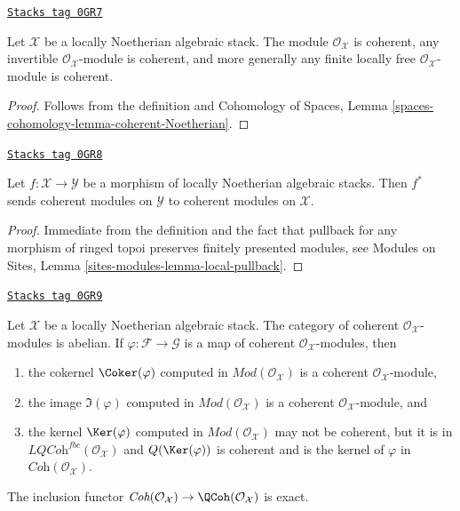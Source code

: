\begin{lemma}
\label{stacks-cohomology-lemma-elementary-coherent}
\href{https://stacks.math.columbia.edu/tag/0GR7}{\texttt{Stacks tag 0GR7}}

Let $\mathcal{X}$ be a locally Noetherian algebraic stack.
The module $\mathcal{O}_\mathcal{X}$ is coherent, any invertible
$\mathcal{O}_\mathcal{X}$-module is coherent, and more generally any
finite locally free $\mathcal{O}_\mathcal{X}$-module is coherent.
\end{lemma}

\begin{proof}
Follows from the definition and
Cohomology of Spaces, Lemma
\ref{spaces-cohomology-lemma-coherent-Noetherian}.
\end{proof}

\begin{lemma}
\label{stacks-cohomology-lemma-pullback-coherent}
\href{https://stacks.math.columbia.edu/tag/0GR8}{\texttt{Stacks tag 0GR8}}

Let $f : \mathcal{X} \to \mathcal{Y}$ be a morphism of locally
Noetherian algebraic stacks. Then $f^*$ sends coherent modules
on $\mathcal{Y}$ to coherent modules on $\mathcal{X}$.
\end{lemma}

\begin{proof}
Immediate from the definition and the fact that pullback for any morphism
of ringed topoi preserves finitely presented modules, see
Modules on Sites, Lemma \ref{sites-modules-lemma-local-pullback}.
\end{proof}

\begin{lemma}
\label{stacks-cohomology-lemma-coherent-abelian-Noetherian}
\href{https://stacks.math.columbia.edu/tag/0GR9}{\texttt{Stacks tag 0GR9}}

Let $\mathcal{X}$ be a locally Noetherian algebraic stack.
The category of coherent $\mathcal{O}_\mathcal{X}$-modules is abelian.
If $\varphi : \mathcal{F} \to \mathcal{G}$ is a map
of coherent $\mathcal{O}_\mathcal{X}$-modules, then
\begin{enumerate}
\item the cokernel $\Coker(\varphi)$ computed in
$\textit{Mod}(\mathcal{O}_\mathcal{X})$ is a coherent
$\mathcal{O}_\mathcal{X}$-module,
\item the image $\Im(\varphi)$ computed in
$\textit{Mod}(\mathcal{O}_\mathcal{X})$ is a coherent
$\mathcal{O}_\mathcal{X}$-module, and
\item the kernel $\Ker(\varphi)$ computed in
$\textit{Mod}(\mathcal{O}_\mathcal{X})$
may not be coherent, but it is
in $\textit{LQCoh}^{fbc}(\mathcal{O}_\mathcal{X})$ and $Q(\Ker(\varphi))$
is coherent and is the kernel of $\varphi$ in
$\textit{Coh}(\mathcal{O}_\mathcal{X})$.
\end{enumerate}
The inclusion functor $\textit{Coh}(\mathcal{O}_\mathcal{X}) \to
\QCoh(\mathcal{O}_\mathcal{X})$ is exact.
\end{lemma}

